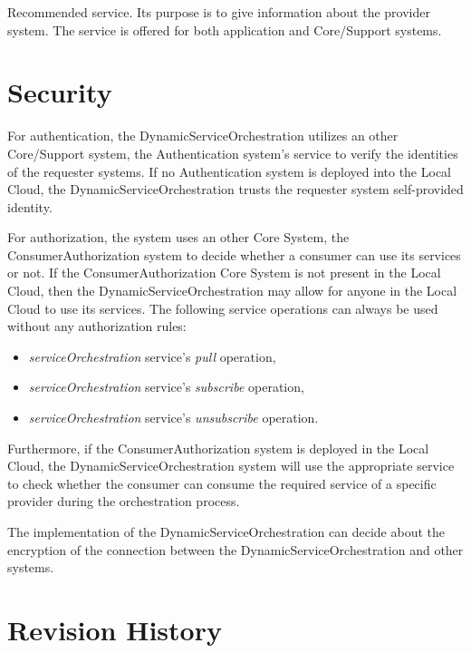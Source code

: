 \documentclass[a4paper]{arrowhead}
\begin{document}
Recommended service. Its purpose is to give information about the provider system. The service is offered for both application and Core/Support systems. 

\newpage

\section{Security}
\label{sec:security}

For authentication, the DynamicServiceOrchestration utilizes an other Core/Support system, the Authentication system's service to verify the identities of the requester systems. If no Authentication system is deployed into the Local Cloud, the DynamicServiceOrchestration trusts the requester system self-provided identity.

For authorization, the system uses an other Core System, the ConsumerAuthorization system to decide whether a consumer can use its services or not. If the ConsumerAuthorization Core System is not present in the Local Cloud, then the DynamicServiceOrchestration may allow for anyone in the Local Cloud to use its services. The following service operations can always be used without any authorization rules:

\begin{itemize}
    \item \textit{serviceOrchestration} service's \textit{pull} operation,
    \item \textit{serviceOrchestration} service's \textit{subscribe} operation,
    \item \textit{serviceOrchestration} service's \textit{unsubscribe} operation.
\end{itemize}

Furthermore, if the ConsumerAuthorization system is deployed in the Local Cloud, the DynamicServiceOrchestration system will use the appropriate service to check whether the consumer can consume the required service of a specific provider during the orchestration process.

The implementation of the DynamicServiceOrchestration can decide about the encryption of the connection between the DynamicServiceOrchestration and other systems. 

\newpage




\newpage

\section{Revision History}
\end{document}
